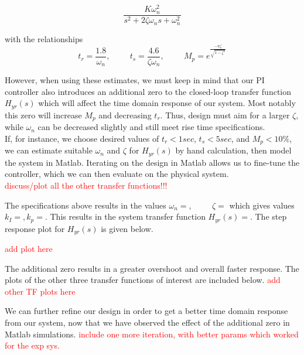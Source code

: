 \documentclass[11pt,titlepage]{article}
\begin{document}
	    \begin{equation}
	    	\frac{K\omega_n^2}{s^2+2\zeta \omega_ns+\omega_{n}^2}
	    \end{equation}
	    
	    with the relationships 
	    \begin{equation}
	    	t_r = \frac{1.8}{\omega_n}, \hspace{1cm} t_s=\frac{4.6}{\zeta\omega_n},  \hspace{1cm}  M_p=e^{\frac{-\pi \zeta}{\sqrt{1-\zeta^2}}}
	    \end{equation}
    
    	However, when using these estimates, we must keep in mind that our PI controller also introduces an additional zero to the closed-loop transfer function $H_{yr}(s)$ which will affect the time domain response of our system. Most notably this zero will increase $M_p$ and decreasing $t_r$. Thus, design must aim for a larger $\zeta$, while $\omega_n$ can be decreased slightly and still meet rise time specifications. \\
    
    	If, for instance, we choose desired values of $t_r<1 sec$, $t_s < 5 sec$, and $M_p<10\%$, we can estimate suitable $\omega_n$ and $\zeta$ for $H_{yr}(s)$ by hand calculation, then model the system in Matlab. Iterating on the design in Matlab allows us to fine-tune the controller, which we can then evaluate on the physical system.\\
	\textcolor{red}{discuss/plot all the other transfer functions!!!}
	
	The specifications above results in the values $\omega_n = , \hspace{1cm} \zeta= $ which gives values $k_I= , k_p= $. This results in the system transfer function $H_{yr}(s) = $. The step response plot for $H_{yr}(s)$ is given below.
	
	\textcolor{red}{add plot here}
	
	The additional zero results in a greater overshoot and overall faster response. The plots of the other three transfer functions of interest are included below. \textcolor{red}{add other TF plots here}
	
	We can further refine our design in order to get a better time domain response from our system, now that we have observed the effect of the additional zero in Matlab simulations. \textcolor{red}{include one more iteration, with better params which worked for the exp sys.}
	
\end{document}

